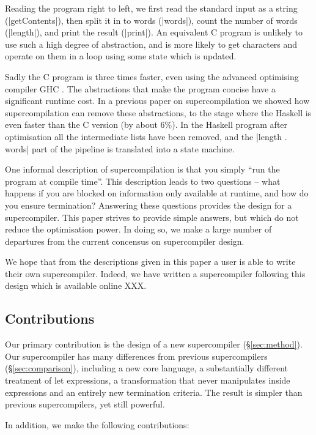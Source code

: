 \documentclass[draft]{sigplanconf}
\newcommand{\unknown}{XXX}
\begin{document}
Reading the program right to left, we first read the standard input as a string (|getContents|), then split it in to words (|words|), count the number of words (|length|), and print the result (|print|). An equivalent C program is unlikely to use such a high degree of abstraction, and is more likely to get characters and operate on them in a loop using some state which is updated.

Sadly the C program is three times faster, even using the advanced optimising compiler GHC \cite{GHC}. The abstractions that make the program concise have a significant runtime cost. In a previous paper on supercompilation \cite{me:supero} we showed how supercompilation can remove these abstractions, to the stage where the Haskell is even faster than the C version (by about 6\%). In the Haskell program after optimisation all the intermediate lists have been removed, and the |length . words| part of the pipeline is translated into a state machine.

One informal description of supercompilation is that you simply ``run the program at compile time''. This description leads to two questions -- what happens if you are blocked on information only available at runtime, and how do you ensure termination? Answering these questions provides the design for a supercompiler. This paper strives to provide simple answers, but which do not reduce the optimisation power. In doing so, we make a large number of departures from the current concensus on supercompiler design.

We hope that from the descriptions given in this paper a user is able to write their own supercompiler. Indeed, we have written a supercompiler following this design which is available online \unknown{}.

\subsection{Contributions}

Our primary contribution is the design of a new supercompiler (\S\ref{sec:method}). Our supercompiler has many differences from previous supercompilers (\S\ref{sec:comparison}), including a new core language, a substantially different treatment of let expressions, a transformation that never manipulates inside expressions and an entirely new termination criteria. The result is simpler than previous supercompilers, yet still powerful.

In addition, we make the following contributions:
\end{document}
